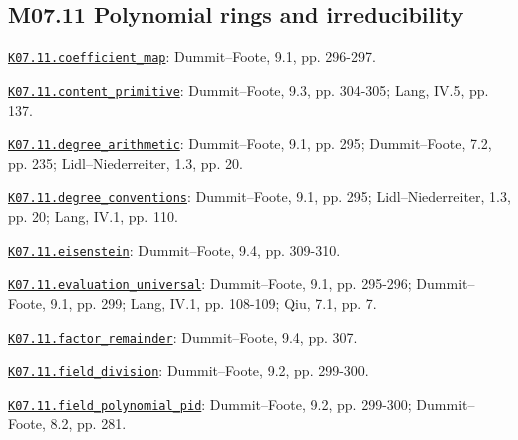 \subsection*{M07.11 Polynomial rings and irreducibility}
\par\smallskip\noindent\hypertarget{src:K07.11.coefficient_map}{}\label{src:K07.11.coefficient_map}\hyperref[K07.11.coefficient_map]{\texttt{K07.11.coefficient\_map}}: Dummit--Foote, 9.1, pp. 296-297.
\par\smallskip\noindent\hypertarget{src:K07.11.content_primitive}{}\label{src:K07.11.content_primitive}\hyperref[K07.11.content_primitive]{\texttt{K07.11.content\_primitive}}: Dummit--Foote, 9.3, pp. 304-305; Lang, IV.5, pp. 137.
\par\smallskip\noindent\hypertarget{src:K07.11.degree_arithmetic}{}\label{src:K07.11.degree_arithmetic}\hyperref[K07.11.degree_arithmetic]{\texttt{K07.11.degree\_arithmetic}}: Dummit--Foote, 9.1, pp. 295; Dummit--Foote, 7.2, pp. 235; Lidl--Niederreiter, 1.3, pp. 20.
\par\smallskip\noindent\hypertarget{src:K07.11.degree_conventions}{}\label{src:K07.11.degree_conventions}\hyperref[K07.11.degree_conventions]{\texttt{K07.11.degree\_conventions}}: Dummit--Foote, 9.1, pp. 295; Lidl--Niederreiter, 1.3, pp. 20; Lang, IV.1, pp. 110.
\par\smallskip\noindent\hypertarget{src:K07.11.eisenstein}{}\label{src:K07.11.eisenstein}\hyperref[K07.11.eisenstein]{\texttt{K07.11.eisenstein}}: Dummit--Foote, 9.4, pp. 309-310.
\par\smallskip\noindent\hypertarget{src:K07.11.evaluation_universal}{}\label{src:K07.11.evaluation_universal}\hyperref[K07.11.evaluation_universal]{\texttt{K07.11.evaluation\_universal}}: Dummit--Foote, 9.1, pp. 295-296; Dummit--Foote, 9.1, pp. 299; Lang, IV.1, pp. 108-109; Qiu, 7.1, pp. 7.
\par\smallskip\noindent\hypertarget{src:K07.11.factor_remainder}{}\label{src:K07.11.factor_remainder}\hyperref[K07.11.factor_remainder]{\texttt{K07.11.factor\_remainder}}: Dummit--Foote, 9.4, pp. 307.
\par\smallskip\noindent\hypertarget{src:K07.11.field_division}{}\label{src:K07.11.field_division}\hyperref[K07.11.field_division]{\texttt{K07.11.field\_division}}: Dummit--Foote, 9.2, pp. 299-300.
\par\smallskip\noindent\hypertarget{src:K07.11.field_polynomial_pid}{}\label{src:K07.11.field_polynomial_pid}\hyperref[K07.11.field_polynomial_pid]{\texttt{K07.11.field\_polynomial\_pid}}: Dummit--Foote, 9.2, pp. 299-300; Dummit--Foote, 8.2, pp. 281.
